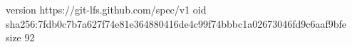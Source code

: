 version https://git-lfs.github.com/spec/v1
oid sha256:7fdb0c7b7a627f74e81e364880416de4c99f74bbbc1a02673046fd9c6aaf9bfe
size 92
